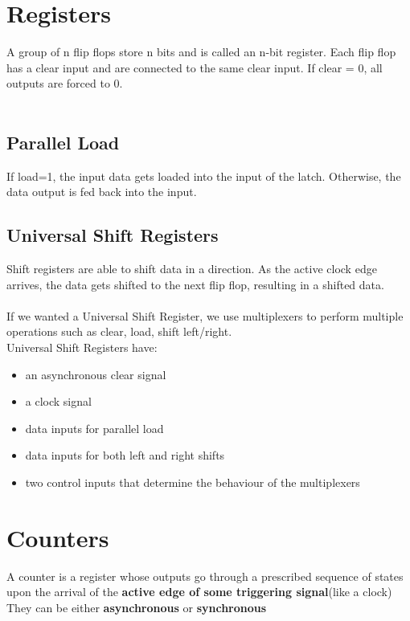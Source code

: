 \documentclass[12pt]{report}
\begin{document}
	\section{Registers}
		A group of n flip flops store n bits and is called an n-bit register. Each flip flop has a clear input and are connected to the same clear input. If clear = 0, all outputs are forced to 0.\\
		\\
		\subsection{Parallel Load}
			If load=1, the input data gets loaded into the input of the latch. Otherwise, the data output is fed back into the input.
		\subsection{Universal Shift Registers}
			Shift registers are able to shift data in a direction. As the active clock edge arrives, the data gets shifted to the next flip flop, resulting in a shifted data.\\
			\\
			If we wanted a Universal Shift Register, we use multiplexers to perform multiple operations such as clear, load, shift left/right.\\
			Universal Shift Registers have:
			\begin{itemize}
				\item an asynchronous clear signal
				\item a clock signal
				\item data inputs for parallel load
				\item data inputs for both left and right shifts
				\item two control inputs that determine the behaviour of the multiplexers
			\end{itemize}
	\section{Counters}
		A counter is a register whose outputs go through a prescribed sequence of states upon the arrival of the \textbf{active edge of some triggering signal}(like a clock)\\
		They can be either \textbf{asynchronous} or \textbf{synchronous}
\end{document}
